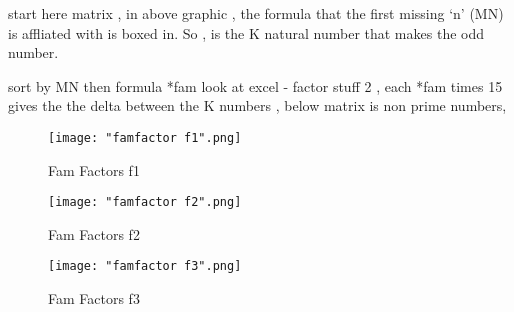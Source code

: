 start here matrix , in above graphic , the formula that the first missing `n' (MN) is affliated with is boxed in. So , is the K natural number that makes the odd number.

sort by MN then formula *fam
look at excel - factor stuff 2 , each *fam times 15 gives the the delta between the K numbers , below matrix is non prime numbers, 
\begin{figure}[h]
    \centering
    \texttt{[image: "famfactor f1".png]}
    \caption{Fam Factors f1}
\end{figure}
\pagebreak



\begin{figure}[h]
    \centering
    \texttt{[image: "famfactor f2".png]}
    \caption{Fam Factors f2}
\end{figure}
\pagebreak



\begin{figure}[h]
    \centering
    \texttt{[image: "famfactor f3".png]}
    \caption{Fam Factors f3}
\end{figure}
\pagebreak



%


